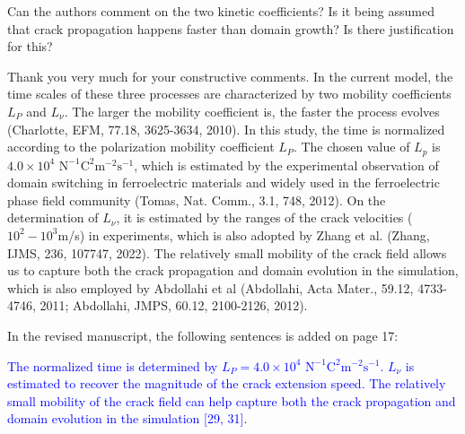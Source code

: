 \documentclass[12pt,fleqn]{article}
\begin{document}
\begin{question}{}\label{R1:Q9}
    Can the authors comment on the two kinetic coefficients? Is it being assumed that crack propagation happens faster than domain growth? Is there justification for this?
\end{question}
\begin{response}
    Thank you very much for your constructive comments. In the current model, the time scales of these three processes are characterized by two mobility coefficients $L_P$ and $L_\nu$. The larger the mobility coefficient is, the faster the process evolves (Charlotte, EFM, 77.18, 3625-3634, 2010).  In this study, the time is normalized according to the polarization mobility coefficient $L_P$. The chosen value of $L_p$ is $4.0\times10^4$ $\text{N}^{-1}\text{C}^2\text{m}^{-2}\text{s}^{-1}$, which is estimated by the experimental observation of domain switching in ferroelectric materials and widely used in the ferroelectric phase field community (Tomas, Nat. Comm., 3.1, 748, 2012). On the determination of $L_\nu$, it is estimated by the ranges of the crack velocities ($10^2-10^3$m/s) in experiments, which is also adopted by Zhang et al. (Zhang, IJMS, 236, 107747, 2022). The relatively small mobility of the crack field allows us to capture both the crack propagation and domain evolution in the simulation, which is also employed by Abdollahi et al (Abdollahi, Acta Mater., 59.12, 4733-4746, 2011; Abdollahi, JMPS, 60.12, 2100-2126, 2012).

    In the revised manuscript, the following sentences is added on page 17:
    \begin{revised}
        \textcolor{blue}{The normalized time is determined by $L_P=4.0\times10^4$ $\text{N}^{-1}\text{C}^2\text{m}^{-2}\text{s}^{-1}$. $L_\nu$ is estimated to recover the magnitude of the crack extension speed. The relatively small mobility of the crack field can help capture both the crack propagation and domain evolution in the simulation [29, 31].}
    \end{revised}
\end{response}
\end{document}

